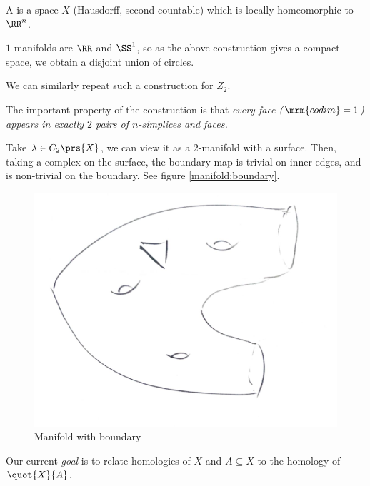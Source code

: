 \documentclass[10pt,a4paper,twoside,openany,hidelinks]{book}
\begin{document}
\begin{definition}
A  is a space $X$ (Hausdorff, second countable) which is locally homeomorphic to $\RR^n$. 
\end{definition}
\begin{remark}
$1$-manifolds are $\RR$ and $\SS^1$, so as the above construction gives a compact space, we obtain a disjoint union of circles.
\end{remark}

We can similarly repeat such a construction for $Z_2$.

\begin{remark}
The important property of the construction is that \emph{every face ($\mrm{codim}=1$) appears in exactly $2$ pairs of $n$-simplices and faces.}
\end{remark}
\begin{remark}
Take $\lambda \in C_2\prs{X}$, we can view it as a $2$-manifold with a surface. Then, taking a complex on the surface, the boundary map is trivial on inner edges, and is non-trivial on the boundary.
See figure \eqref{manifold:boundary}.
\begin{figure}
\includegraphics[scale=0.7]{sources/4_3}
\caption{Manifold with boundary}
\label{manifold:boundary}
\end{figure}
\end{remark}

Our current \emph{goal} is to relate homologies of $X$ and $A \subseteq X$ to the homology of $\quot{X}{A}$.
\end{document}
